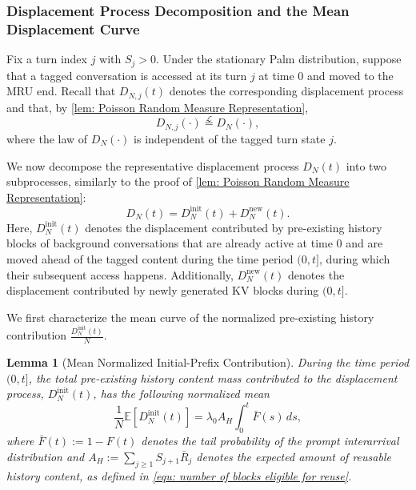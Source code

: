 \documentclass{article}
\newtheorem{lemma}[lemma]{Lemma}
\theoremstyle{definition}
\newcommand{\E}{\mathbb E}
\newcommand{\init}{\mathrm{init}}
\newcommand{\newb}{\mathrm{new}}
\begin{document}
\subsubsection{Displacement Process Decomposition and the Mean Displacement Curve}
\label{sssec: Displacement Process Decomposition}

Fix a turn index $j$ with $S_j>0$. Under the stationary Palm distribution, suppose that a tagged conversation is accessed at its turn $j$ at time $0$ and moved to the MRU end. Recall that $D_{N,j}(t)$ denotes the corresponding displacement process and that, by \cref{lem: Poisson Random Measure Representation},
\begin{equation*}
    D_{N,j}(\cdot)\stackrel{\mathcal L}{=}D_N(\cdot),
\end{equation*}
where the law of $D_N(\cdot)$ is independent of the tagged turn state $j$.

We now decompose the representative displacement process $D_N(t)$ into two subprocesses, similarly to the proof of \cref{lem: Poisson Random Measure Representation}:
\begin{equation}
    \label{equ: displacement decomposition}
    D_N(t)=D_N^{\init}(t)+D_N^{\newb}(t).
\end{equation}
Here, $D_N^{\init}(t)$ denotes the displacement contributed by pre-existing history blocks of background conversations that are already active at time $0$ and are moved ahead of the tagged content during the time period $(0,t]$, during which their subsequent access happens. Additionally, $D_N^{\newb}(t)$ denotes the displacement contributed by newly generated KV blocks during $(0,t]$.


We first characterize the mean curve of the normalized pre-existing history contribution $\frac{D_N^{\init}(t)}{N}$.

\begin{lemma}[Mean Normalized Initial-Prefix Contribution]
    \label{lem: Initial-prefix contribution}
    During the time period $(0,t]$, the total pre-existing history content mass contributed to the displacement process, $D_N^{\init}(t)$, has the following normalized mean
    \begin{equation}
    \label{equ: mean normalized initial-prefix contribution}
        \frac{1}{N}\E[D_N^{\init}(t)]=\lambda_0A_H\int_0^t\bar F(s)\,ds,
    \end{equation}
    where $\bar F(t):=1-F(t)$ denotes the tail probability of the prompt interarrival distribution and $A_H:=\sum_{j\geq1}S_{j+1}\bar R_j$ denotes the expected amount of reusable history content, as defined in \eqref{equ: number of blocks eligible for reuse}.
\end{lemma}
\end{document}
